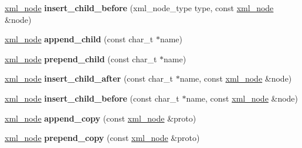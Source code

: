 \begin{DoxyCompactItemize}
\item 
\hypertarget{classpugi_1_1xml__node_afe89f53c01eac8209b06f9fe7f84e7c1}{}\hyperlink{classpugi_1_1xml__node}{xml\+\_\+node} {\bfseries insert\+\_\+child\+\_\+before} (xml\+\_\+node\+\_\+type type, const \hyperlink{classpugi_1_1xml__node}{xml\+\_\+node} \&node)\label{classpugi_1_1xml__node_afe89f53c01eac8209b06f9fe7f84e7c1}

\item 
\hypertarget{classpugi_1_1xml__node_a448342425806a4ad8068bf98fd4ff462}{}\hyperlink{classpugi_1_1xml__node}{xml\+\_\+node} {\bfseries append\+\_\+child} (const char\+\_\+t $\ast$name)\label{classpugi_1_1xml__node_a448342425806a4ad8068bf98fd4ff462}

\item 
\hypertarget{classpugi_1_1xml__node_afa78286431f99a0f35b18185e11e28e8}{}\hyperlink{classpugi_1_1xml__node}{xml\+\_\+node} {\bfseries prepend\+\_\+child} (const char\+\_\+t $\ast$name)\label{classpugi_1_1xml__node_afa78286431f99a0f35b18185e11e28e8}

\item 
\hypertarget{classpugi_1_1xml__node_a778c2246fef9964b2d947253a86f2982}{}\hyperlink{classpugi_1_1xml__node}{xml\+\_\+node} {\bfseries insert\+\_\+child\+\_\+after} (const char\+\_\+t $\ast$name, const \hyperlink{classpugi_1_1xml__node}{xml\+\_\+node} \&node)\label{classpugi_1_1xml__node_a778c2246fef9964b2d947253a86f2982}

\item 
\hypertarget{classpugi_1_1xml__node_a70fa68762aed11c82a1b913571df4394}{}\hyperlink{classpugi_1_1xml__node}{xml\+\_\+node} {\bfseries insert\+\_\+child\+\_\+before} (const char\+\_\+t $\ast$name, const \hyperlink{classpugi_1_1xml__node}{xml\+\_\+node} \&node)\label{classpugi_1_1xml__node_a70fa68762aed11c82a1b913571df4394}

\item 
\hypertarget{classpugi_1_1xml__node_a17971e2b69c4dd4f45c461ebffe96732}{}\hyperlink{classpugi_1_1xml__node}{xml\+\_\+node} {\bfseries append\+\_\+copy} (const \hyperlink{classpugi_1_1xml__node}{xml\+\_\+node} \&proto)\label{classpugi_1_1xml__node_a17971e2b69c4dd4f45c461ebffe96732}

\item 
\hypertarget{classpugi_1_1xml__node_a29cc787ee2270e3a71e1d511164621e6}{}\hyperlink{classpugi_1_1xml__node}{xml\+\_\+node} {\bfseries prepend\+\_\+copy} (const \hyperlink{classpugi_1_1xml__node}{xml\+\_\+node} \&proto)\label{classpugi_1_1xml__node_a29cc787ee2270e3a71e1d511164621e6}


\end{DoxyCompactItemize}
